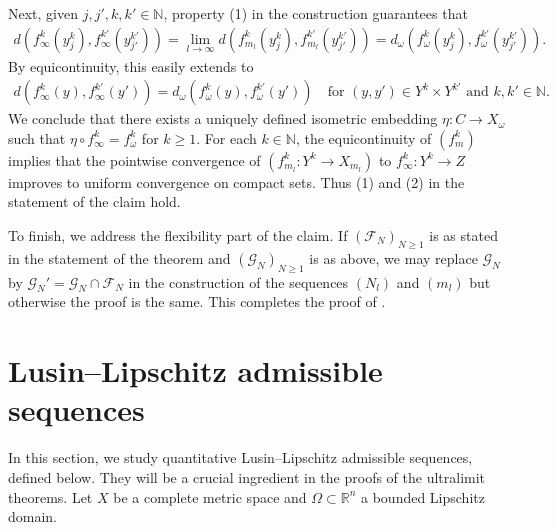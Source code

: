\documentclass[a4paper,leqno]{amsart}
\numberwithin{equation}{section}
\theoremstyle{remark}
\theoremstyle{remark}
\newcommand{\N}{\mathbb{N}}
\newcommand{\R}{\mathbb{R}}
\begin{document}
Next, given $j, j', k, k' \in \mathbb{N}$, property (1) in the construction guarantees that
\begin{align*}
    d( f_{\infty}^{k}( y_{j}^{k} ), f_{\infty}^{k'}( y_{j'}^{k'} ) )
    =
    \lim_{ l \rightarrow \infty }
    d( f_{m_l}^{k}( y_{j}^{k} ), f_{m_l}^{k'}( y_{j'}^{k'} ) )
    =
    d_\omega( f_{\omega}^{k}( y_{j}^k ), f_{\omega}^{k'}( y_{j'}^{k'} ) ).
\end{align*}
By equicontinuity, this easily extends to
\begin{align*}
    d( f_{\infty}^k(y), f_{\infty}^{k'}(y') ) = d_{\omega}( f_{\omega}^{k}(y), f_{\omega}^{k'}(y') )
    \quad\text{for $(y,y') \in Y^k \times Y^{k'}$ and $k,k' \in \N$.}
\end{align*}
We conclude that there exists a uniquely defined isometric embedding $\eta \colon C \to X_\omega$ such that $\eta \circ f_{\infty}^{k} = f_{\omega}^k$ for $k \geq 1$. For each $k \in \N$, the equicontinuity of $( f_m^k )$ implies that the pointwise convergence of $( f_{m_l}^{k} \colon Y^k \to X_{m_l} )$ to $f_{\infty}^k \colon Y^k \to Z$ improves to uniform convergence on compact sets. Thus (1) and (2) in the statement of the claim hold.

To finish, we address the flexibility part of the claim. If $( \mathcal{F}_N )_{ N \geq 1 }$ is as stated in the statement of the theorem and $( \mathcal{G}_N )_{ N \geq 1 }$ is as above, we may replace $\mathcal{G}_N$ by $\mathcal{G}_N' = \mathcal{G}_N \cap \mathcal{F}_N$ in the construction of the sequences $(N_l)$ and $( m_l )$ but otherwise the proof is the same. This completes the proof of .






















\section{Lusin--Lipschitz admissible sequences}\label{section-lusin-lipschitz-admissible-sequences}
In this section, we study quantitative Lusin--Lipschitz admissible sequences, defined below. They will be a crucial ingredient in the proofs of the ultralimit theorems. Let $X$ be a complete metric space and $\Omega \subset\R^n$ a bounded Lipschitz domain.
\end{document}
